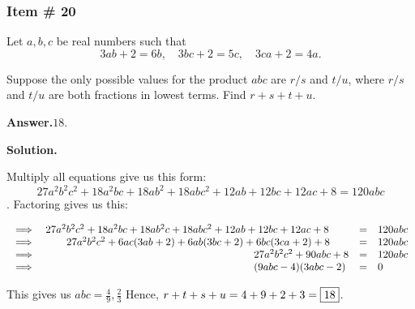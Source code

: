 \documentclass[11pt,paper=letter]{scrartcl}
\newcommand{\ans}[1]{{\sffamily \bfseries Answer.}\;\(\boxed{\text{#1}}\).}
\newcommand{\sol}{{\sffamily \bfseries Solution.}\;}
\begin{document}
\newpage

\subsubsection{Item \# 20}

\begin{probboxed}
Let $a,b,c$ be real numbers such that $$3ab + 2 = 6b, \quad 3bc + 2 = 5c, \quad 3ca + 2 =4a.$$
    
   Suppose the only possible values for the product $abc$ are $r/s$ and $t/u$, where $r/s $ and $t/u$ are both fractions in lowest terms. Find $r+s+t+u.$
\end{probboxed}

\ans{18}

\sol

Multiply all equations give us this form: $$27a^2b^2c^2 + 18a^2bc +18ab^2 + 18abc^2 + 12ab + 12bc + 12ac + 8 =120abc$$. Factoring gives us this:

\vspace{-1cm}

\begin{center}
    \begin{equation*}
        \begin{array}{llll}
            \implies & 27a^2b^2c^2 + 18a^2bc +18ab^2c + 18abc^2 + 12ab + 12bc + 12ac + 8 & = & 120abc \\
            
           \implies & \hspace{7mm} 27a^2b^2c^2 + 6ac(3ab +2) + 6ab(3bc+2) + 6bc(3ca +2) + 8 & = & 120abc \\
           
           \implies &  \hspace{7cm} 27a^2b^2c^2 + 90abc + 8 & = & 120abc \\
           
           \implies &  \hspace{7cm}  (9abc -4) (3abc -2) & = & 0\\
        \end{array}
    \end{equation*}
\end{center}

This gives us $abc= \frac{4}{9}, \frac{2}{3} $  Hence, $r+t+s+u = 4 + 9 + 2 + 3 = \fbox{18}$.
\end{document}
